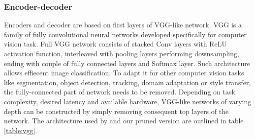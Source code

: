 \documentclass[../Main.tex]{subfiles}
\begin{document}
    \subsubsection{Encoder-decoder}
    Encoders and decoder are based on first layers of VGG-like \cite{vgg}
    network. VGG is a family of fully convolutional neural networks developed 
    specifically for computer vision task. Full VGG network consists of
    stacked Conv layers with ReLU activation function, interleaved with pooling
    layers performing downsampling, ending with couple of fully
    connected layers and Softmax layer. Such architecture allows effiecent image classification.
    To adapt it for other computer vision tasks like segmentation, object detection,
    tracking, domain adaptation or style transfer, the fully-connected part
    of network needs to be removed. Depending on task complexity, desired
    latency and available hardware, VGG-like networks of varying depth can be 
    constructed by simply removing consequent top layers of the network.
    The architecture used by \cite{Li2018} and our pruned version are 
    outlined in table \ref{table:vgg}. 
    
\end{document}
